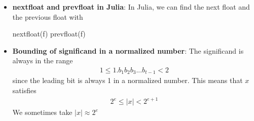 \documentclass{report}
\begin{document}
\begin{itemize}
\begin{figure}[ht]
                    \label{fig:beholdmane}
                \end{figure}
            \item \textbf{nextfloat and prevfloat in Julia}: In Julia, we can find the next float and the previous float with
                \bigbreak \noindent 
                \begin{jlcode}
                nextfloat(f)
                prevfloat(f)
                \end{jlcode}
            \item \textbf{Bounding of significand in a normalized number}: The significand is always in the range
                \begin{align*}
                    1 \leq 1.b_{1}b_{2}b_{3}...b_{t-1} < 2
                \end{align*}
                since the leading bit is always 1 in a normalized number.
                \bigbreak \noindent 
                This means that $x$ satisfies
                \begin{align*}
                    2^{e} \leq \left\lvert x \right\rvert < 2^{e+1}
                \end{align*}
                We sometimes take $\left\lvert x \right\rvert \approx 2^{e} $



\end{itemize}
\end{document}
